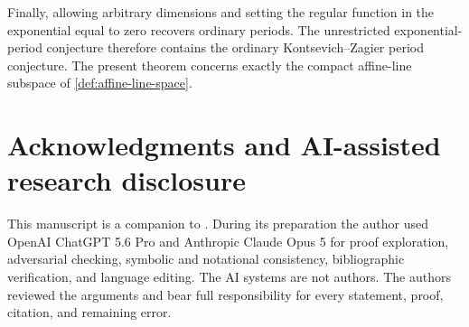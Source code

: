\documentclass[11pt]{article}
\numberwithin{equation}{section}
\theoremstyle{definition}
\theoremstyle{remark}
\begin{document}
Finally, allowing arbitrary dimensions and setting the regular function in
the exponential equal to zero recovers ordinary periods.  The unrestricted
exponential-period conjecture therefore contains the ordinary
Kontsevich--Zagier period conjecture.  The present theorem concerns exactly
the compact affine-line subspace of \cref{def:affine-line-space}.

\section*{Acknowledgments and AI-assisted research disclosure}

This manuscript is a companion to \cite{LongEIT}.  During its preparation
the author used OpenAI ChatGPT 5.6 Pro and Anthropic Claude Opus 5 for proof
exploration, adversarial checking, symbolic and notational consistency,
bibliographic verification, and language editing.  The AI systems are not
authors.  The authors reviewed the arguments and bear full
responsibility for every statement, proof, citation, and remaining error.
\end{document}
